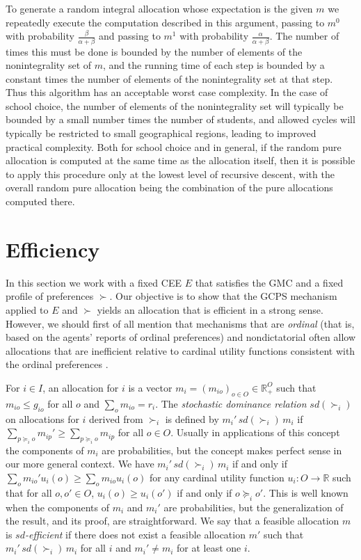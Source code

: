 \documentclass[12pt]{article}
\theoremstyle{definition}
\renewcommand{\Re}{\mathbb{R}}
\begin{document}
To generate a random integral allocation whose expectation is the given $m$ we repeatedly execute the computation described in this argument, passing to $m^0$ with probability $\tfrac{\beta}{\alpha + \beta}$ and  passing to $m^1$ with probability $\tfrac{\alpha}{\alpha + \beta}$.  The number of times this must be done is bounded by the number of elements of the nonintegrality set of $m$, and the running time of each step is bounded by a constant times the number of elements of the nonintegrality set at that step.  Thus this algorithm has an acceptable worst case complexity.  In the case of school choice, the number of elements of the nonintegrality set will typically be bounded by a small number times the number of students, and allowed cycles will typically be restricted to small geographical regions, leading to improved practical complexity.  Both for school choice and in general, if the random pure allocation is computed at the same time as the allocation itself, then it is possible to apply this procedure only at the lowest level of recursive descent, with the overall random pure allocation being the combination of the pure allocations computed there.


\section{Efficiency} \label{sec:Efficiency}

In this section we work with a fixed CEE $E$ that satisfies the GMC and a fixed profile of preferences $\succ$.  Our objective is to show that the GCPS mechanism applied to $E$ and $\succ$ yields an allocation that is efficient in a strong sense. However, we should first of all mention that mechanisms that are \emph{ordinal} (that is, based on the agents' reports of ordinal preferences) and nondictatorial often allow allocations that are inefficient relative to cardinal utility functions consistent with the ordinal preferences \citep{FeNi08,Mir09,AbChYa11,Tro12,AbChYa15}.

For $i \in I$, an allocation for $i$ is a vector $m_i = (m_{io})_{o \in O} \in \Re^O_+$ such that $m_{io} \le g_{io}$ for all $o$ and 
$\sum_o m_{io} = r_i$.  The \emph{stochastic dominance relation} ${sd}(\succ_i)$ on allocations for $i$ derived from $\succ_i$ is defined by $m_i' \, {sd}(\succ_i) \, m_i$ if $\sum_{p \succeq_i o} m_{ip}' \ge \sum_{p \succeq_i o} m_{ip}$ for all $o \in O$.  Usually in applications of this concept the components of $m_i$ are probabilities, but the concept makes perfect sense in our more general context.  We have $m_i' \, {sd}(\succ_i) \, m_i$ if and only if $\sum_o m_{io}' u_i(o) \ge \sum_o m_{io} u_i(o)$ for any cardinal utility function $u_i : O \to \Re$ such that for all $o,o' \in O$, $u_i(o) \ge u_i(o')$ if and only if $o \succeq_i o'$.  This is well known when the components of $m_i$ and $m_i'$ are probabilities, but the generalization of the result, and its proof, are straightforward.  We say that a feasible allocation $m$ is \emph{$sd$-efficient} if there does not exist a feasible allocation $m'$ such that $m_i' \, {sd}(\succ_i) \, m_i$ for all $i$ and $m_i' \ne m_i$ for at least one $i$.
\end{document}
